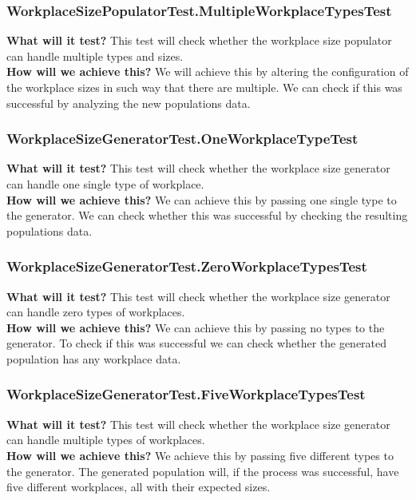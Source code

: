 \documentclass{article}
\begin{document}
\subsubsection{WorkplaceSizePopulatorTest.MultipleWorkplaceTypesTest}
\textbf{What will it test?}
This test will check whether the workplace size populator can handle multiple types and sizes. \\
\newline
\textbf{How will we achieve this?}
We will achieve this by altering the configuration of the workplace sizes in such way that there are multiple. We can check if this was successful by analyzing the new populations data.

\subsubsection{WorkplaceSizeGeneratorTest.OneWorkplaceTypeTest}
\textbf{What will it test?}
This test will check whether the workplace size generator can handle one single type of workplace.\\
\newline
\textbf{How will we achieve this?}
We can achieve this by passing one single type to the generator. We can check whether this was successful by checking the resulting populations data.

\subsubsection{WorkplaceSizeGeneratorTest.ZeroWorkplaceTypesTest}
\textbf{What will it test?}
This test will check whether the workplace size generator can handle zero types of workplaces.\\
\newline
\textbf{How will we achieve this?}
We can achieve this by passing no types to the generator. To check if this was successful we can check whether the generated population has any workplace data.

\subsubsection{WorkplaceSizeGeneratorTest.FiveWorkplaceTypesTest}
\textbf{What will it test?}
This test will check whether the workplace size generator can handle multiple types of workplaces.\\
\newline
\textbf{How will we achieve this?}
We achieve this by passing five different types to the generator. The generated population will, if the process was successful, have five different workplaces, all with their expected sizes.
\end{document}
